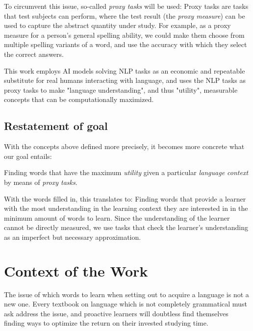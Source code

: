 To circumvent this issue, so-called \textit{proxy tasks} will be used:
Proxy tasks are tasks that test subjects can perform, where the test result (the \textit{proxy measure}) can be used to capture the abstract quantity under study.
For example, as a proxy measure for a person's general spelling ability, we could make them choose from multiple spelling variants of a word, and use the accuracy with which they select the correct answers.

This work employs AI models solving NLP tasks as an economic and repeatable substitute for real humans interacting with language, and uses the NLP tasks as proxy tasks to make "language understanding", and thus "utility", measurable concepts that can be computationally maximized.

\subsection{Restatement of goal}
With the concepts above defined more precisely, it becomes more concrete what our goal entails:

Finding words that have the maximum \textit{utility} given a particular \textit{language context} by means of \textit{proxy tasks}.

With the words filled in, this translates to:
Finding words that provide a learner with the most understanding in the learning context they are interested in in the minimum amount of words to learn.
Since the understanding of the learner cannot be directly measured, we use tasks that check the learner's understanding as an imperfect but necessary approximation.



\section{Context of the Work} \label{seq:context-of-work}

The issue of which words to learn when setting out to acquire a language is not a new one.
Every textbook on language which is not completely grammatical must ask address the issue, and proactive learners will doubtless find themselves finding ways to optimize the return on their invested studying time.

